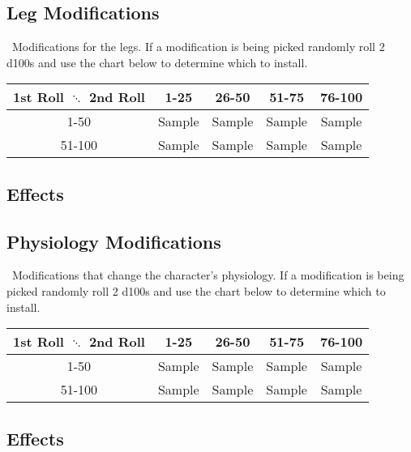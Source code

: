 \subsection{Leg Modifications}
\biot\ Modifications for the legs. If a modification is being picked randomly roll 2 d100s and use the chart below to determine which to install.
\begin{center}
\begin{tabular}{c | c | c | c | c}
1st Roll $\ddots$ 2nd Roll & 1-25 & 26-50 & 51-75 & 76-100 \\
\hline
1-50 & Sample & Sample & Sample & Sample\\
\hline
51-100 & Sample & Sample & Sample & Sample\\
\end{tabular}
\end{center}
\subsection*{Effects}
\begin{multicols}{2}
\end{multicols}
\clearpage

\subsection{Physiology Modifications}
\biot\ Modifications that change the character's physiology. If a modification is being picked randomly roll 2 d100s and use the chart below to determine which to install.
\begin{center}
\begin{tabular}{c | c | c | c | c}
1st Roll $\ddots$ 2nd Roll & 1-25 & 26-50 & 51-75 & 76-100 \\
\hline
1-50 & Sample & Sample & Sample & Sample\\
\hline
51-100 & Sample & Sample & Sample & Sample\\
\end{tabular}
\end{center}
\subsection*{Effects}
\begin{multicols}{2}
\end{multicols}
\clearpage


